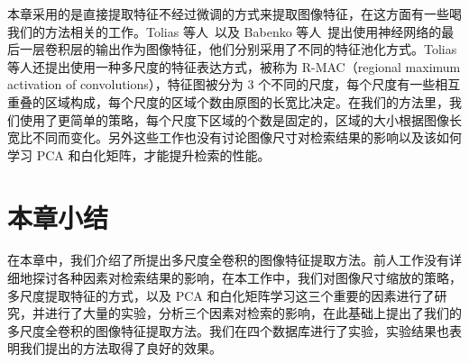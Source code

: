 本章采用的是直接提取特征不经过微调的方式来提取图像特征，在这方面有一些喝我们的方法相关的工作。Tolias 等人~\cite{Tolias2015ParticularOR}以及 Babenko 等人~\cite{Babenko2015AggregatingLD}提出使用神经网络的最后一层卷积层的输出作为图像特征，他们分别采用了不同的特征池化方式。Tolias 等人还提出使用一种多尺度的特征表达方式，被称为 R-MAC（regional maximum activation of convolutions），特征图被分为 3 个不同的尺度，每个尺度有一些相互重叠的区域构成，每个尺度的区域个数由原图的长宽比决定。在我们的方法里，我们使用了更简单的策略，每个尺度下区域的个数是固定的，区域的大小根据图像长宽比不同而变化。另外这些工作也没有讨论图像尺寸对检索结果的影响以及该如何学习 PCA 和白化矩阵，才能提升检索的性能。

\section{本章小结}\label{sec:mfc_conclusion}
在本章中，我们介绍了所提出多尺度全卷积的图像特征提取方法。前人工作没有详细地探讨各种因素对检索结果的影响，在本工作中，我们对图像尺寸缩放的策略，多尺度提取特征的方式，以及 PCA 和白化矩阵学习这三个重要的因素进行了研究，并进行了大量的实验，分析三个因素对检索的影响，在此基础上提出了我们的多尺度全卷积的图像特征提取方法。我们在四个数据库进行了实验，实验结果也表明我们提出的方法取得了良好的效果。

